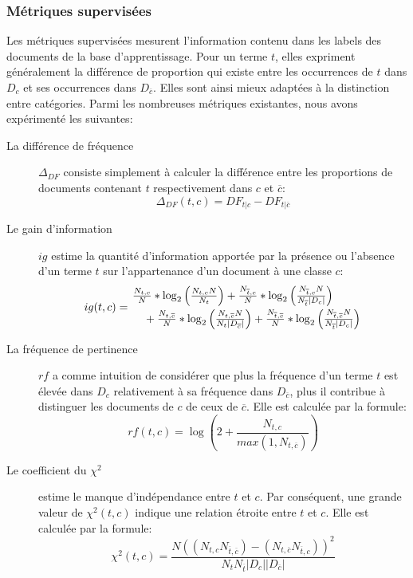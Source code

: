 \subsubsection{Métriques supervisées}
Les métriques supervisées mesurent l'information contenu dans les labels des documents de la base d'apprentissage. Pour un terme $t$, elles expriment généralement la différence de proportion qui existe entre les occurrences de $t$ dans $D_c$ et ses occurrences dans $D_{\overline{c}}$. Elles sont ainsi mieux adaptées à la distinction entre catégories. Parmi les nombreuses métriques existantes, nous avons expérimenté les suivantes: 
\begin{description}
	\item[La différence de fréquence] $\Delta_{DF}$ consiste simplement à calculer la différence entre les proportions de documents contenant $t$ respectivement dans $c$ et $\overline{c}$:
	\[\Delta_{DF}(t,c) = DF_{t \vert c} - DF_{t \vert \overline{c}}\]
	\item[Le gain d'information] $ig$ \citep{yang1997IGandIMandCHIandTS} estime la quantité d'information apportée par la présence ou l'absence d'un terme $t$ sur l'appartenance d'un document à une classe $c$:
	\begin{equation*} %
	ig(t, c) = \splitdfrac{\frac{N_{t,c}}{N} * \log_2 \left(\frac{N_{t,c}N}{N_{t}}\right)
		 + \frac{N_{\overline{t},c}}{N} * \log_2 \left(\frac{N_{\overline{t},c}N}{N_{\overline{t}}\vert D_c \vert}\right)}
	{+ \frac{N_{t,\overline{c}}}{N} * \log_2 \left(\frac{N_{t,\overline{c}}N}{N_{t}\vert D_{\overline{c}}\vert}\right)
	+ \frac{N_{\overline{t},\overline{c}}}{N} * \log_2 \left(\frac{N_{\overline{t},\overline{c}}N}{N_{\overline{t}}\vert D_c \vert}\right)}
	\end{equation*}
	\item[La fréquence de pertinence] $rf$ \citep{lan2009rf} a comme intuition de considérer que  plus la fréquence d'un terme $t$ est élevée dans $D_c$ relativement à sa fréquence dans $D_{\overline{c}}$, plus il contribue à distinguer les documents de $c$ de ceux de $\overline{c}$. Elle est calculée par la formule:
	\[rf(t,c) = \log\left(2 + \frac{N_{t,c}}{max(1, N_{t,\overline{c}})}\right)\]
	\item[Le coefficient du $\chi^2$] \citep{schutze1995chi2} estime le manque d'indépendance entre $t$ et $c$. Par conséquent, une grande valeur de  $\chi^2(t,c)$ indique une relation étroite entre $t$ et $c$. Elle est calculée par la formule:
	\[\chi^2(t,c) = \frac{N ((N_{t,c} N_{\overline{t},\overline{c}}) - (N_{t,\overline{c}} N_{\overline{t},c}))^2}{N_t N_{\overline{t}} \vert D_c \vert  \vert D_{\overline{c}} \vert }\]

\end{description}
